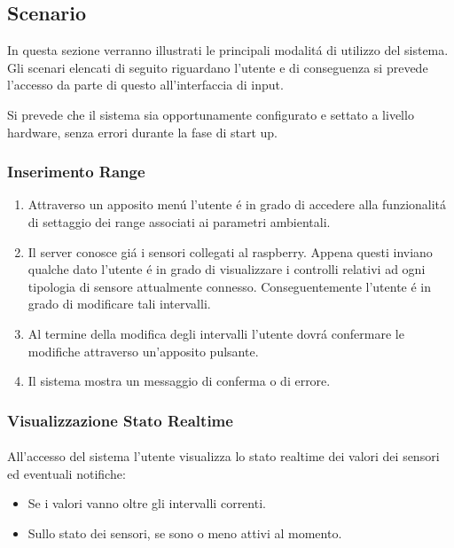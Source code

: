 \subsection{Scenario}

In questa sezione verranno illustrati le principali modalit\'a di utilizzo del sistema. Gli scenari elencati di seguito riguardano l'utente e di conseguenza si prevede l'accesso da parte di questo all'interfaccia di input.

Si prevede che il sistema sia opportunamente configurato e settato a livello hardware, senza errori durante la fase di start up.

\subsubsection{Inserimento Range}

\begin{enumerate}
  \item Attraverso un apposito men\'u l'utente \'e in grado di accedere alla funzionalit\'a di settaggio dei range associati ai parametri ambientali.
  \item Il server conosce gi\'a i sensori collegati al raspberry. Appena questi inviano qualche dato l'utente \'e in grado di visualizzare i controlli relativi ad ogni tipologia di sensore attualmente connesso. Conseguentemente l'utente \'e in grado di modificare tali intervalli.
  \item Al termine della modifica degli intervalli l'utente dovr\'a confermare le modifiche attraverso un'apposito pulsante.
  \item Il sistema mostra un messaggio di conferma o di errore.
\end{enumerate}

\subsubsection{Visualizzazione Stato Realtime}

\paragraph{} All'accesso del sistema l'utente visualizza lo stato realtime dei valori dei sensori ed eventuali notifiche:
\begin{itemize}
  \item Se i valori vanno oltre gli intervalli correnti.
  \item Sullo stato dei sensori, se sono o meno attivi al momento.
\end{itemize}

